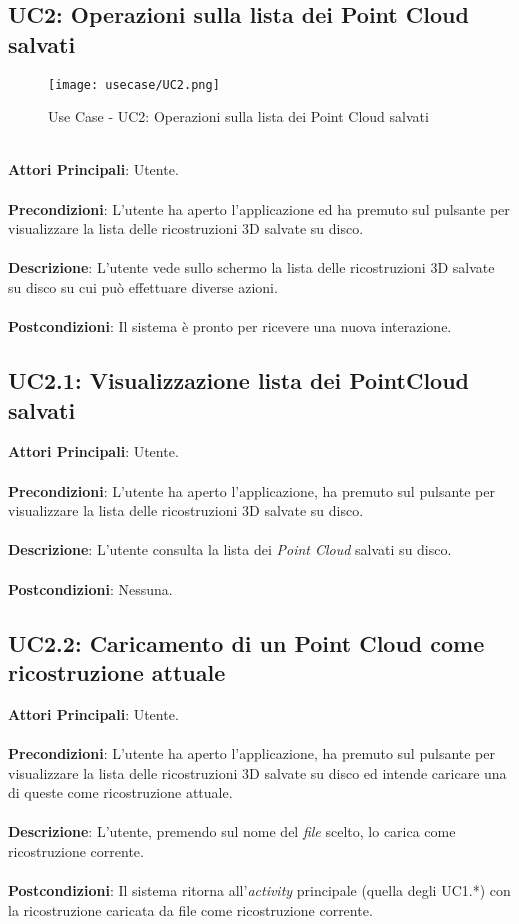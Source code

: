 \subsection{UC2: Operazioni sulla lista dei Point Cloud salvati}
\begin{figure}[H] 
    \centering 
    \texttt{[image: usecase/UC2.png]} 
    \caption{Use Case - UC2: Operazioni sulla lista dei Point Cloud salvati}
\end{figure}
\ \\
\textbf{Attori Principali}: Utente.
\\\\ \textbf{Precondizioni}: L'utente ha aperto l'applicazione ed ha premuto sul pulsante per visualizzare la lista delle ricostruzioni 3D salvate su disco.
\\\\ \textbf{Descrizione}: L'utente vede sullo schermo la lista delle ricostruzioni 3D salvate su disco su cui può effettuare diverse azioni.
\\\\ \textbf{Postcondizioni}: Il sistema è pronto per ricevere una nuova interazione.


\subsection{UC2.1: Visualizzazione lista dei PointCloud salvati}
\textbf{Attori Principali}: Utente.
\\\\ \textbf{Precondizioni}: L'utente ha aperto l'applicazione, ha premuto sul pulsante per visualizzare la lista delle ricostruzioni 3D salvate su disco.
\\\\ \textbf{Descrizione}: L'utente consulta la lista dei \emph{Point Cloud} salvati su disco.
\\\\ \textbf{Postcondizioni}: Nessuna.

\subsection{UC2.2: Caricamento di un Point Cloud come ricostruzione attuale}
\textbf{Attori Principali}: Utente.
\\\\ \textbf{Precondizioni}: L'utente ha aperto l'applicazione, ha premuto sul pulsante per visualizzare la lista delle ricostruzioni 3D salvate su disco ed intende caricare una di queste come ricostruzione attuale.
\\\\ \textbf{Descrizione}: L'utente, premendo sul nome del \emph{file} scelto, lo carica come ricostruzione corrente.
\\\\ \textbf{Postcondizioni}: Il sistema ritorna all'\emph{activity} principale (quella degli UC1.*) con la ricostruzione caricata da file come ricostruzione corrente.

